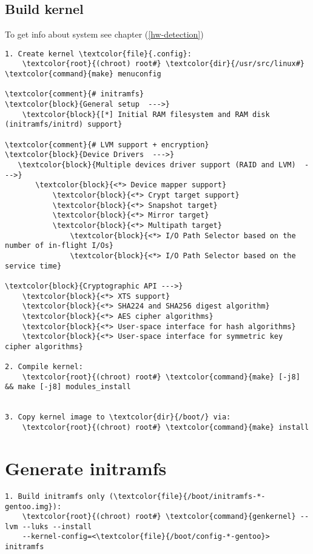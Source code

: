 \documentclass[10pt, a4paper, onecolumn, openany]{book}         %
\begin{document}
\subsection{Build kernel}
To get info about system see chapter (\underline{\ref{hw-detection}})
\begin{Verbatim}[commandchars=\\\{\}]
1. Create kernel \textcolor{file}{.config}:
    \textcolor{root}{(chroot) root#} \textcolor{dir}{/usr/src/linux#} \textcolor{command}{make} menuconfig

\textcolor{comment}{# initramfs}
\textcolor{block}{General setup  --->}
    \textcolor{block}{[*] Initial RAM filesystem and RAM disk (initramfs/initrd) support}

\textcolor{comment}{# LVM support + encryption}
\textcolor{block}{Device Drivers  --->}
   \textcolor{block}{Multiple devices driver support (RAID and LVM)  --->}
       \textcolor{block}{<*> Device mapper support}
           \textcolor{block}{<*> Crypt target support}
           \textcolor{block}{<*> Snapshot target}
           \textcolor{block}{<*> Mirror target}
           \textcolor{block}{<*> Multipath target}
               \textcolor{block}{<*> I/O Path Selector based on the number of in-flight I/Os}
               \textcolor{block}{<*> I/O Path Selector based on the service time}

\textcolor{block}{Cryptographic API --->}
    \textcolor{block}{<*> XTS support}
    \textcolor{block}{<*> SHA224 and SHA256 digest algorithm}
    \textcolor{block}{<*> AES cipher algorithms}
    \textcolor{block}{<*> User-space interface for hash algorithms}
    \textcolor{block}{<*> User-space interface for symmetric key cipher algorithms}

2. Compile kernel:
    \textcolor{root}{(chroot) root#} \textcolor{command}{make} [-j8] && make [-j8] modules_install
    

3. Copy kernel image to \textcolor{dir}{/boot/} via:
    \textcolor{root}{(chroot) root#} \textcolor{command}{make} install
\end{Verbatim}

\section{Generate initramfs}
\begin{Verbatim}[commandchars=\\\{\}]
1. Build initramfs only (\textcolor{file}{/boot/initramfs-*-gentoo.img}):
    \textcolor{root}{(chroot) root#} \textcolor{command}{genkernel} --lvm --luks --install
    --kernel-config=<\textcolor{file}{/boot/config-*-gentoo}> initramfs
\end{Verbatim}
\end{document}
